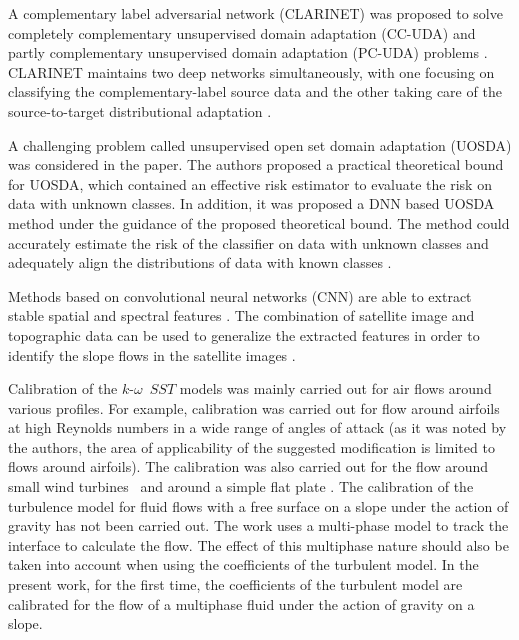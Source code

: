 \documentclass[mathematics,article,submit,pdftex,moreauthors]{Definitions/mdpi}
\begin{document}
A complementary label adversarial network (CLARINET) was proposed to solve completely complementary unsupervised domain adaptation (CC-UDA) and partly complementary unsupervised domain adaptation (PC-UDA) problems . CLARINET maintains two deep networks simultaneously, with one focusing on classifying the complementary-label source data and the other taking care of the source-to-target distributional adaptation \cite{ZhangLiuFang2021}. 

A challenging problem called unsupervised open set domain adaptation (UOSDA) was considered in the paper. The authors proposed a practical theoretical bound for UOSDA, which contained an effective risk estimator to evaluate the risk on data with unknown classes. In addition, it was proposed a DNN based UOSDA method under the guidance of the proposed theoretical bound. The method could accurately estimate the risk of the classifier on data with unknown classes and adequately align the distributions of data with known classes \cite{ZhongFangLiu2021}.


Methods based on convolutional neural networks (CNN) are able to extract stable spatial and spectral features \cite{Maggiori2017}. The combination of satellite image and topographic data can be used to generalize the extracted features in order to identify the slope flows in the satellite images \cite{Qin2021, Prakash2021}.

Calibration of the $k$-$\omega$~$SST$ models \cite{Menter1993, Menter1994, MenterKuntzLangtry2003} was mainly carried out for air flows around various profiles. For example, calibration was carried out for flow around airfoils at high Reynolds numbers in a wide range of angles of attack \cite{MatyushenkoGarbaruk2016} (as it was noted by the authors, the area of applicability of the suggested modification is limited to flows around airfoils). The calibration was also carried out for the flow around small wind turbines~\cite{rocha2016case, rocha2014} and around a simple flat plate \cite{kalitzin2016improvements}. 
The calibration of the turbulence model for fluid flows with a free surface on a slope under the action of gravity has not been carried out. The work uses a multi-phase model to track the interface to calculate the flow. The effect of this multiphase nature should also be taken into account when using the coefficients of the turbulent model. In the present work, for the first time, the coefficients of the turbulent model are calibrated for the flow of a multiphase fluid under the action of gravity on a slope.
\end{document}
